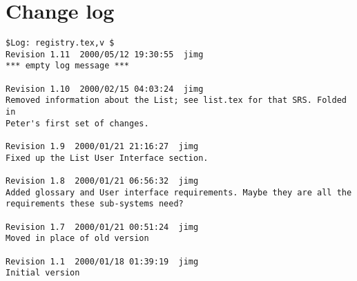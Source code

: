 \documentclass{article}
\begin{document}
\section{Change log}

\begin{verbatim}
$Log: registry.tex,v $
Revision 1.11  2000/05/12 19:30:55  jimg
*** empty log message ***

Revision 1.10  2000/02/15 04:03:24  jimg
Removed information about the List; see list.tex for that SRS. Folded in
Peter's first set of changes.

Revision 1.9  2000/01/21 21:16:27  jimg
Fixed up the List User Interface section.

Revision 1.8  2000/01/21 06:56:32  jimg
Added glossary and User interface requirements. Maybe they are all the
requirements these sub-systems need?

Revision 1.7  2000/01/21 00:51:24  jimg
Moved in place of old version

Revision 1.1  2000/01/18 01:39:19  jimg
Initial version
\end{verbatim}



\end{document}

